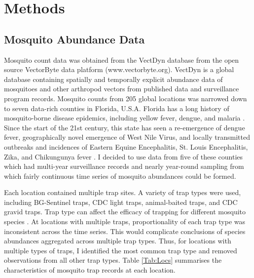 \section{Methods}

\subsection{Mosquito Abundance Data}


Mosquito count data was obtained from the VectDyn database from the open source VectorByte data platform (www.vectorbyte.org). VectDyn is a global database containing spatially and temporally explicit abundance data of mosquitoes and other arthropod vectors from published data and surveillance program records. Mosquito counts from 205 global locations was narrowed down to seven data-rich counties in Florida, U.S.A. Florida has a long history of mosquito-borne disease epidemics, including yellow fever, dengue, and malaria \citep{Connelly2014}. Since the start of the 21st century, this state has seen a re-emergence of dengue fever, geographically novel emergence of West Nile Virus, and locally transmitted outbreaks and incidences of Eastern Equine Encephalitis, St. Louis Encephalitis, Zika, and Chikungunya fever . I decided to use data from five of these counties which had multi-year surveillance records and nearly year-round sampling from which fairly continuous time series of mosquito abundances could be formed. 

Each location contained multiple trap sites. A variety of trap types were used, including BG-Sentinel traps, CDC light traps, animal-baited traps, and CDC gravid traps. Trap type can affect the efficacy of trapping for different mosquito species \citep{Li2016}. At locations with multiple traps, proportionality of each trap type was inconsistent across the time series. This would complicate conclusions of species abundances aggregated across multiple trap types. Thus, for locations with multiple types of traps, I identified the most common trap type and removed observations from all other trap types. Table \ref{Tab:Locs} summarises the characteristics of mosquito trap records at each location.

